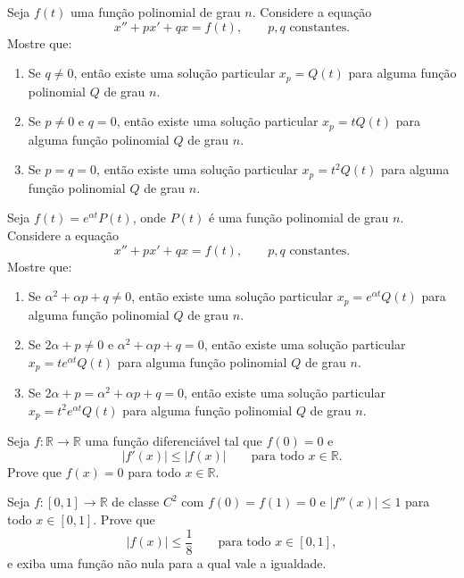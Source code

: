 \documentclass[10pt,a4paper]{amsart}
\newcommand{\R}{\mathbb{R}}
\begin{document}
\vspace{5mm}

 Seja $f(t)$ uma função polinomial de grau $n$. Considere a equação
\[
    x'' + px' + qx = f(t), \qquad p, q \text{ constantes}.
\]
Mostre que:
\begin{enumerate}[label=(\alph*)]
    \item Se $q \neq 0$, então existe uma solução particular $x_p = Q(t)$ para alguma função polinomial $Q$ de grau $n$.
    \item Se $p \neq 0$ e $q = 0$, então existe uma solução particular $x_p = tQ(t)$ para alguma função polinomial $Q$ de grau $n$.
    \item Se $p = q = 0$, então existe uma solução particular $x_p = t^2 Q(t)$ para alguma função polinomial $Q$ de grau $n$.
\end{enumerate}

\vspace{5mm}

 Seja $f(t) = e^{\alpha t} P(t)$, onde $P(t)$ é uma função polinomial de grau $n$. Considere a equação
\[
    x'' + px' + qx = f(t), \qquad p, q \text{ constantes}.
\]
Mostre que:
\begin{enumerate}[label=(\alph*)]
    \item Se $\alpha^2 + \alpha p + q \neq 0$, então existe uma solução particular $x_p = e^{\alpha t} Q(t)$ para alguma função polinomial $Q$ de grau $n$.
    \item Se $2\alpha + p \neq 0$ e $\alpha^2 + \alpha p + q = 0$, então existe uma solução particular $x_p = t e^{\alpha t} Q(t)$ para alguma função polinomial $Q$ de grau $n$.
    \item Se $2\alpha + p = \alpha^2 + \alpha p + q = 0$, então existe uma solução particular $x_p = t^2 e^{\alpha t} Q(t)$ para alguma função polinomial $Q$ de grau $n$.
\end{enumerate}

\vspace{5mm}

 Seja $f : \R \to \R$ uma função diferenciável tal que $f(0) = 0$ e
\[
    |f'(x)| \leq |f(x)| \qquad \text{para todo } x \in \R.
\]
Prove que $f(x) = 0$ para todo $x \in \R$.

\vspace{5mm}

 Seja $f : [0,1] \to \R$ de classe $C^2$ com $f(0) = f(1) = 0$ e $|f''(x)| \leq 1$ para todo $x \in [0,1]$. Prove que
\[
    |f(x)| \leq \frac{1}{8} \qquad \text{para todo } x \in [0,1],
\]
e exiba uma função não nula para a qual vale a igualdade.
\end{document}
